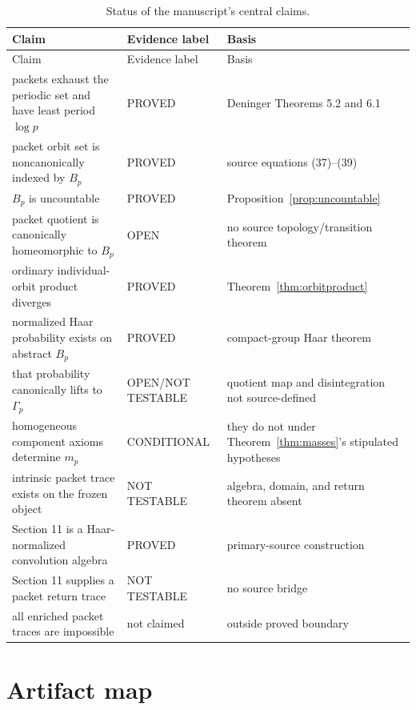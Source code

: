 \documentclass[11pt]{article}
\theoremstyle{definition}
\theoremstyle{remark}
\newcommand{\proved}{\textsf{PROVED}}
\newcommand{\conditional}{\textsf{CONDITIONAL}}
\newcommand{\openclaim}{\textsf{OPEN}}
\newcommand{\nottest}{\textsf{NOT TESTABLE}}
\begin{document}
\begin{longtable}{p{}p{}p{}}
\caption{Status of the manuscript's central claims.}\label{tab:claims}\\
\toprule
Claim & Evidence label & Basis\\
\midrule
\endfirsthead
\toprule
Claim & Evidence label & Basis\\
\midrule
\endhead
packets exhaust the periodic set and have least period \(\log p\) & \proved & Deninger Theorems 5.2 and 6.1\\
packet orbit set is noncanonically indexed by \(B_p\) & \proved & source equations (37)--(39)\\
\(B_p\) is uncountable & \proved & Proposition~\ref{prop:uncountable}\\
packet quotient is canonically homeomorphic to \(B_p\) & \openclaim & no source topology/transition theorem\\
ordinary individual-orbit product diverges & \proved & Theorem~\ref{thm:orbitproduct}\\
normalized Haar probability exists on abstract \(B_p\) & \proved & compact-group Haar theorem\\
that probability canonically lifts to \(\Gamma_p\) & \openclaim/\nottest & quotient map and disintegration not source-defined\\
homogeneous component axioms determine \(m_p\) & \conditional & they do not under Theorem~\ref{thm:masses}'s stipulated hypotheses\\
intrinsic packet trace exists on the frozen object & \nottest & algebra, domain, and return theorem absent\\
Section 11 is a Haar-normalized convolution algebra & \proved & primary-source construction\\
Section 11 supplies a packet return trace & \nottest & no source bridge\\
all enriched packet traces are impossible & not claimed & outside proved boundary\\
\bottomrule
\end{longtable}

\section{Artifact map}
\end{document}
